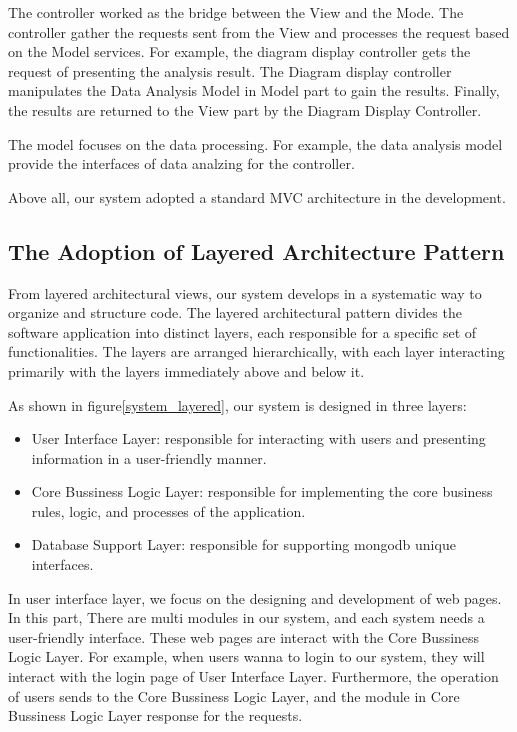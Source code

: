 \documentclass[conference]{IEEEtran}
\begin{document}
The controller worked as the bridge between the View and the Mode. The controller gather the requests sent from the View and processes the request based on the Model services. For example, the diagram display controller gets the request of presenting the analysis result. The Diagram display controller manipulates the Data Analysis Model in Model part to gain the results. Finally, the results are returned to the View part by the Diagram Display Controller.

The model focuses on the data processing. For example, the data analysis model provide the interfaces of data analzing for the controller. 

Above all, our system adopted a standard MVC architecture in the development.

\subsection{\textbf{The Adoption of Layered Architecture Pattern}}

From layered architectural views, our system develops in a systematic way to organize and structure code. The layered architectural pattern divides the software application into distinct layers, each responsible for a specific set of functionalities. The layers are arranged hierarchically, with each layer interacting primarily with the layers immediately above and below it. 

As shown in figure\ref{system_layered}, our system is designed in three layers: 

\begin{itemize}
    \item User Interface Layer: responsible for interacting with users and presenting information in a user-friendly manner.

    \item Core Bussiness Logic Layer: responsible for implementing the core business rules, logic, and processes of the application.

    \item Database Support Layer: responsible for supporting mongodb unique interfaces.
\end{itemize}


In user interface layer, we focus on the designing and development of web pages. In this part,  There are multi modules in our system, and each system needs a user-friendly interface. These web pages are interact with the Core Bussiness Logic Layer. For example, when users wanna to login to our system, they will interact with the login page of User Interface Layer. Furthermore, the operation of users sends to the Core Bussiness Logic Layer, and the module in Core Bussiness Logic Layer response for the requests.
\end{document}
